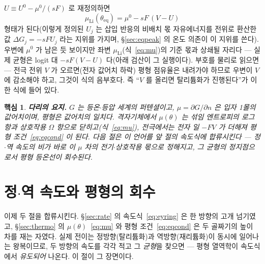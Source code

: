 \documentclass[11pt,a4paper]{article}
\newtheorem*{keybox}{핵심}
\newcommand{\eq}{\mathrm{eq}}
\begin{document}
$U\equiv U^0-\mu^0/(sF)$ 로 재정의하면
\begin{equation}
\mu_{\mathrm{Li}}(\theta_{\eq})=\mu^0-sF\,(V-U)
\label{eq:eqcond}
\end{equation}
형태가 된다(이렇게 정의된 $U_j$ 는
삽입 반응의 비배치 몫 자유에너지를 전위로 환산한 값 $\Delta G_j=-sFU_j$ 라는 지위를 가지며,
\S\ref{sec:eqpeak} 의 온도 의존이 이 지위를 쓴다). 우변에 $\mu^0$ 가 남은 듯 보이지만 좌변
$\mu_{\mathrm{Li}}$(식~\eqref{eq:mu})의 기준 몫과 상쇄될 자리다 — 실제 균형은 logit 대
$-sF(V-U)$ 다(아래 검산이 그 실행이다). 부호를 물리로 읽으면 — 전극 전위 $V$ 가
오르면(전자 값어치 하락) 평형 점유율은 내려가야 하므로 우변이 $V$ 에 감소해야 하고, 그것이 식의 음부호다.
즉 ``$V$ 를 올리면 탈리튬화가 진행된다''가 이 한 식에 들어 있다.

\begin{keybox}
\textbf{다리의 요지.} $G$ 는 등온$\cdot$등압 세계의 퍼텐셜이고, $\mu=\partial G/\partial n$ 은 입자
1몰의 값어치이며, 평형은 값어치의 일치다. 격자기체에서 $\mu(\theta)$ 는 섞임 엔트로피의 로그 항과 상호작용
$\Omega$ 항으로 닫히고(식~\eqref{eq:mu}), 전극에서는 전자 일 $-FV$ 가 더해져 평형 조건~\eqref{eq:eqcond}
이 된다. 다음 절은 이 언어를 앞 절의 속도식에 합류시킨다 — 정$\cdot$역 속도의 비가 바로 이 $\mu$ 차의
전기$\cdot$상호작용 몫으로 정해지고, 그 균형의 정지점으로서 평형 등온선이 \emph{회수된다}.
\end{keybox}

\section{정$\cdot$역 속도와 평형의 회수}\label{sec:fwdrev}
이제 두 절을 합류시킨다. \S\ref{sec:rate} 의 속도식~\eqref{eq:eyring} 은 한 방향의 고개
넘기였고, \S\ref{sec:thermo} 의 $\mu(\theta)$~\eqref{eq:mu} 와 평형 조건~\eqref{eq:eqcond} 은
두 골짜기의 높이 차를 재는 자였다. 실제 전이는 정방향(탈리튬화)과 역방향(재리튬화)이 동시에
일어나는 왕복이므로, 두 방향의 속도를 각각 적고 그 \emph{균형}을 찾으면 — 평형 열역학이 속도식에서
\emph{유도되어} 나온다. 이 절이 그 장면이다.
\end{document}
